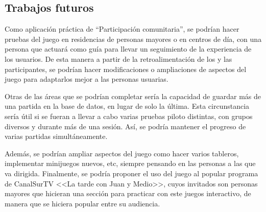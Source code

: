 \subsection{Trabajos futuros}

Como aplicación práctica de \enquote{Participación comunitaria}, se podrían hacer pruebas del juego en residencias de personas mayores o en centros de día, con una persona que actuará como guía para llevar un seguimiento de la experiencia de los usuarios. De esta manera a partir de la retroalimentación de los y las participantes, se podrían hacer modificaciones o ampliaciones de aspectos del juego para adaptarlos mejor a las personas usuarias.

Otras de las áreas que se podrían completar sería la capacidad de guardar más de una partida en la base de datos, en lugar de solo la última. Esta circunstancia sería útil si se fueran a llevar a cabo varias pruebas piloto distintas, con grupos diversos y durante más de una sesión. Así, se podría mantener el progreso de varias partidas simultáneamente.

Además, se podrían ampliar aspectos del juego como hacer varios tableros, implementar minijuegos nuevos, etc, siempre pensando en las personas a las que va dirigida. Finalmente, se podría proponer el uso del juego al popular programa de CanalSurTV <<La tarde con Juan y Medio>>, cuyos invitados son personas mayores que hicieran una sección para practicar con este juegos interactivo, de manera que se hiciera popular entre su audiencia.
